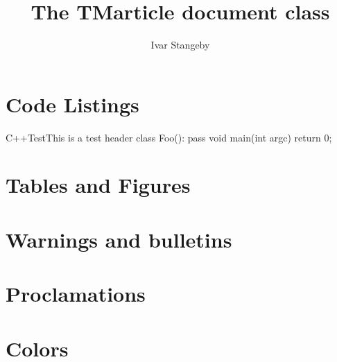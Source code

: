 \documentclass{TMarticle}
\author{Ivar Stangeby}
\title{The TMarticle document class}
\begin{document}
\maketitle
\section{Code Listings}

\begin{TMcode}{C++}{Test}{This is a test header}
class Foo():
    pass
void main(int argc) {
    return 0;
}
\end{TMcode}

\section{Tables and Figures}

\section{Warnings and bulletins}
\section{Proclamations}
\section{Colors}
\end{document}
